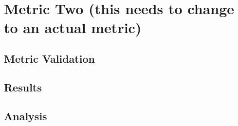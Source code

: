 \section{Metric Two \FIXME(this needs to change to an actual metric)}

\subsection{Metric Validation}

\subsection{Results}

\subsection{Analysis}
